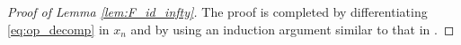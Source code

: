 \documentclass[12pt]{amsart}
\def\p{\partial}
\def\N{\mathbb N}
\newtheorem{lemma}[theorem]{Lemma}
\theoremstyle{definition}
\theoremstyle{remark}
\newcommand{\tbl}[1]{\textcolor{blue}{#1}}
\newcommand{\f}[1]{\footnote{\tbl{#1}}}
\begin{document}
\begin{proof}[Proof of Lemma \ref{lem:F_id_infty}]
The proof is completed by differentiating \eqref{eq:op_decomp} in $x_n$ and by using an induction argument similar to that in \cite[Lemma 3.4]{lassas2016calder}.
 
%  
% 
% 
%  

\end{proof}

% 
% 
%  




\end{document}
